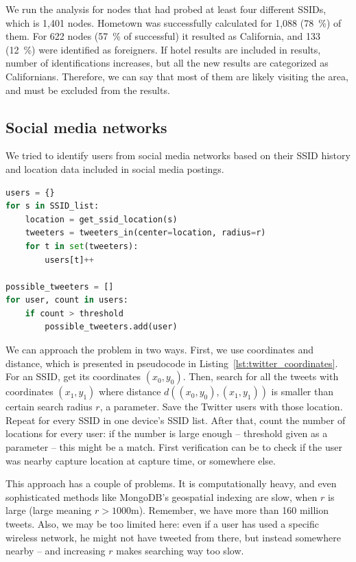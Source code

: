 \documentclass[12pt,a4paper,oneside,pdftex]{report}
\begin{document}
We run the analysis for nodes that had probed at least four different SSIDs, which is 1,401 nodes. Hometown was successfully calculated for 1,088 (78~\%) of them. For 622 nodes (57~\% of successful) it resulted as California, and 133 (12~\%) were identified as foreigners. If hotel results are included in results, number of identifications increases, but all the new results are categorized as Californians. Therefore, we can say that most of them are likely visiting the area, and must be excluded from the results.

\subsection{Social media networks}
\label{sec:practical_social}

We tried to identify users from social media networks based on their SSID history and location data included in social media postings. 

\begin{lstlisting}[language=Python, 
    caption={Pseudocode for finding Twitter users},
    label={lst:twitter_coordinates}
]
users = {}
for s in SSID_list:
    location = get_ssid_location(s)
    tweeters = tweeters_in(center=location, radius=r)
    for t in set(tweeters):
        users[t]++

possible_tweeters = []
for user, count in users:
    if count > threshold
        possible_tweeters.add(user)
\end{lstlisting}

We can approach the problem in two ways. First, we use coordinates and distance, which is presented in pseudocode in Listing~\ref{lst:twitter_coordinates}. For an SSID, get its coordinates $(x_0, y_0)$. Then, search for all the tweets with coordinates $(x_1, y_1)$ where distance 
$d\left( (x_0,y_0), (x_1,y_1) \right)$ 
is smaller than certain search radius $r$, a parameter. Save the Twitter users with those location. Repeat for every SSID in one device's SSID list. After that, count the number of locations for every user: if the number is large enough -- threshold given as a parameter -- this might be a match. First verification can be to check if the user was nearby capture location at capture time, or somewhere else.

This approach has a couple of problems. It is computationally heavy, and even sophisticated methods like MongoDB's geospatial indexing are slow, when $r$ is large (large meaning $r>1000 \text{m}$). Remember, we have more than 160 million tweets. Also, we may be too limited here: even if a user has used a specific wireless network, he might not have tweeted from there, but instead somewhere nearby -- and increasing $r$ makes searching way too slow.
\end{document}
